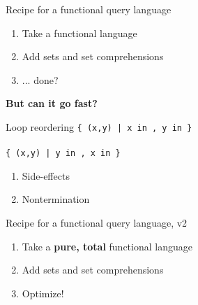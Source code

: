 \documentclass[xcolor=table,usenames,dvipsnames,svgnames]{beamer}
\begin{document}

\begin{frame}{Recipe for a functional query language}\Large

  \begin{enumerate}\itemsep 1.5em
  \item Take a functional language
  \item Add sets and set comprehensions
  \item {\color{red} ... done?}
  \end{enumerate}
\end{frame}


\begin{frame}\centering
  {\bf\huge But can it go fast?}
\end{frame}

\begin{frame}{Loop reordering}\large\centering
  \texttt{\{ (x,y) | x in ,
    y in \}}
  \vspace{0.5em}\\
  {\Large {}}
  \vspace{0.5em}\\
  \texttt{\{ (x,y) | y in ,
    x in \}}

  \pause
  \vspace{3em}\Large
  \begin{minipage}{0.5\textwidth}
    \begin{enumerate}
    \item {\alt<3>{\color{red}}{} Side-effects}
    \item { Nontermination}
    \end{enumerate}
  \end{minipage}
\end{frame}


\begin{frame}{Recipe for a functional query language, v2}\Large
  \begin{enumerate}\itemsep 1.5em
  \item Take a \textbf{pure, total} functional language
  \item Add sets and set comprehensions
  \item {\color{orange} Optimize!}
  \end{enumerate}
\end{frame}
\end{document}
